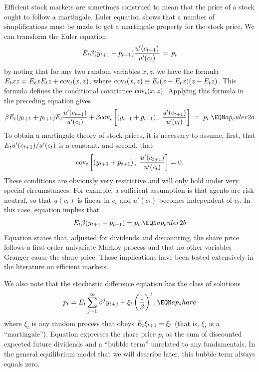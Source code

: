 Efficient stock markets are sometimes construed to mean that the price of a
stock ought to follow a martingale. Euler equation 
shows that a number of simplifications must be made to
get a martingale property for the stock price.  We can transform
the Euler equation
$$
E_t{\beta} (y_{t+1} + p_{t+1}) {u'(c_{t+1}) \over u'(c_t)} \,=\, p_t
$$
by noting that for any two random variables $x,z$, we have the
formula $E_txz=E_tx E_tz+ {\rm cov}_t(x,z)$, where ${\rm cov}_t(x,z)
 \equiv E_t (x-E_tx)(z-E_tz)$.  This formula defines the conditional
covariance ${\rm cov}_t(x,z)$.
%
Applying this formula in the preceding equation gives
$$\be E_t (y_{t+1} + p_{t+1})  E_t {u'(c_{t+1}) \over u'(c_t)}
+\be \cov_t \left[(y_{t+1} + p_{t+1})\,,\; {u'(c_{t+1}) \over u'(c_t)} \right]
\;=\; p_t.                                          \EQN ap_euler2a   $$
To obtain a martingale theory of stock prices, it is necessary to assume,
first, that $E_t u'(c_{t+1})/u'(c_t)$ is a constant, and second, that
$${\rm cov}_t \left[(y_{t+1} + p_{t+1})\,,\; {u'(c_{t+1}) \over u'(c_t)} \right] = 0.
$$
These conditions are obviously very restrictive and will only hold under
very special circumstances. For example, a sufficient assumption is that
agents are risk neutral, so that $u(c_t)$ is linear in $c_t$ and $u'(c_t)$
becomes independent of $c_t$.  In this case, equation 
implies that
$$E_t\be (y_\tone+p_\tone) = p_t.    \EQN ap_euler2b$$
Equation  states that, adjusted for
dividends and discounting, the share price follows a first-order
univariate Markov process and that no other variables Granger cause
the share price.  These implications have been tested extensively
in the literature on efficient markets.

We also note that the stochastic difference equation  has
the class of solutions
$$p_t=E_t \sum_{j=1}^\infty \be^j y_{t+j} +\xi_t
\left({1\over\be}\right)^t,                \EQN ap_share $$
where $\xi_t$ is any random process that obeys $E_t \xi_{{t+1}}=\xi_t$ (that
is, $\xi_t$ is a ``martingale''). Equation  expresses the
share price $p_t$ as the sum of discounted expected
future dividends and a ``bubble term'' unrelated to any fundamentals. In the
general equilibrium model that we will describe later,
this bubble term always equals zero.

